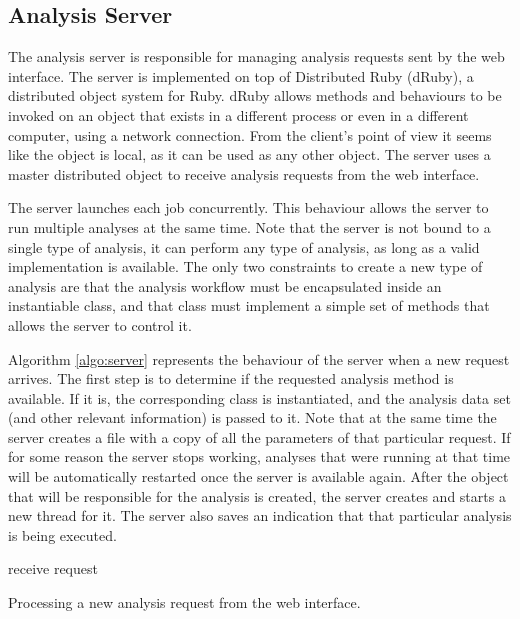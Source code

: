 \subsection{Analysis Server}

The analysis server is responsible for managing analysis requests sent by the
web interface. The server is implemented on top of Distributed Ruby (dRuby), a
distributed object system for Ruby. dRuby allows methods and behaviours to be
invoked on an object that exists in a different process or even in a different
computer, using a network connection. From the client's point of view it seems
like the object is local, as it can be used as any other object. The server uses
a master distributed object to receive analysis requests from the web interface.

The server launches each job concurrently. This behaviour allows the server to
run multiple analyses at the same time. Note that the server is not bound to a
single type of analysis, it can perform any type of analysis, as long as a valid
implementation is available. The only two constraints to create a new type of
analysis are that the analysis workflow must be encapsulated inside an
instantiable class, and that class must implement a simple set of methods that
allows the server to control it.

Algorithm \ref{algo:server} represents the behaviour of the server when a new
request arrives. The first step is to determine if the requested analysis method
is available. If it is, the corresponding class is instantiated, and the
analysis data set (and other relevant information) is passed to it. Note that
at the same time the server creates a file with a copy of all the parameters of
that particular request. If for some reason the server stops working, analyses
that were running at that time will be automatically restarted once the server
is available again. After the object that will be responsible for the analysis
is created, the server creates and starts a new thread for it. The server also
saves an indication that that particular analysis is being executed.

\begin{algorithm}
  \LinesNumbered

  receive request\;
  \BlankLine

  \caption[Processing a new analysis request from the web interface]{
    Processing a new analysis request from the web interface.
  }
  \label{algo:server}
\end{algorithm}

